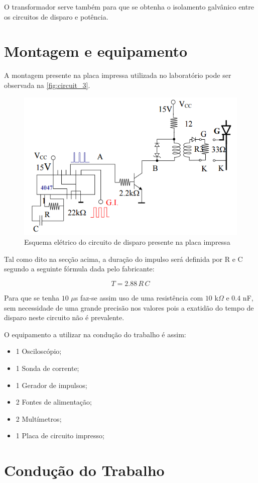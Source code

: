 \documentclass[a4paper,11pt]{article}
\numberwithin{equation}{section}
\begin{document}
O transformador serve também para que se obtenha o isolamento galvânico entre os circuitos de disparo e potência.

\section{Montagem e equipamento}

A montagem presente na placa impressa utilizada no laboratório pode ser observada na \autoref{fig:circuit_3}.

\begin{figure}[h]
	\centering
	\includegraphics[width=\linewidth]{img/assembly_circuit}
	\caption{Esquema elétrico do circuito de disparo presente na placa impressa}
	\label{fig:circuit_3}
\end{figure}

Tal como dito na secção acima, a duração do impulso será definida por R e C segundo a seguinte fórmula dada pelo fabricante:

$$ T = 2.88 \, R \, C $$

Para que se tenha $10$ $\mu$s faz-se assim uso de uma resistência com $10$ k$\Omega$ e $0.4$ nF, sem necessidade de uma grande precisão nos valores pois a exatidão do tempo de disparo neste circuito não é prevalente.

O equipamento a utilizar na condução do trabalho é assim:

\begin{itemize}
\item 1 Osciloscópio;
\item 1 Sonda de corrente;
\item 1 Gerador de impulsos;
\item 2 Fontes de alimentação;
\item 2 Multímetros;
\item 1 Placa de circuito impresso;
\end{itemize}

\section{Condução do Trabalho}
\end{document}
